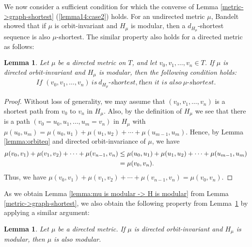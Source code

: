 \documentclass[11pt]{article}
\theoremstyle{definition}
\newtheorem{lemma}[theorem]{Lemma}
\begin{document}
We now consider a sufficient condition for which the converse of Lemma \ref{metric->graph-shortest} (\ref{lemma14:case2}) holds. For an undirected metric $\mu$, Bandelt \cite{bandelt1985} showed that if $\mu$ is orbit-invariant and $H_\mu$ is modular, then a $d_{H_\mu}$-shortest sequence is also $\mu$-shortest. The similar property also holds for a directed metric as follows:
\begin{lemma}
\label{lem:d-shortest->mu-shortest}
\textit{Let $\mu$ be a directed metric on $T$, and let $v_0,v_1,\ldots,v_n\in T$. If $\mu$ is directed orbit-invariant and $H_\mu$ is modular, then the following condition holds:}
\begin{align}
    \textit{If\ }(v_0,v_1,\ldots,v_n)\ \textit{is}\ 
    d_{H_\mu}\textit{-shortest,}\ \textit{then\ it\ is\ also}\ \mu\textit{-shortest.}
\end{align}
\end{lemma}
\begin{proof}
Without loss of generality, we may assume that $(v_0,v_1,\ldots,v_n)$ is a shortest path from $v_0$ to $v_n$ in $H_\mu$. Also, by the definition of $H_\mu$ we see that there is a path $(v_0=u_0,u_1,\ldots,u_m=v_n)$ in $H_\mu$ with $\mu(u_0,u_m)=\mu(u_0,u_1)+\mu(u_1,u_2)+\cdots+\mu(u_{m-1},u_m)$. Hence, by Lemma \ref{lemma:orbiteq} and directed orbit-invariance of $\mu$, we have
\begin{align}
    \mu(v_0,v_1)+\mu(v_1,v_2)+\cdots+\mu(v_{n-1},v_n)&\leq \mu(u_0,u_1)+\mu(u_1,u_2)+\cdots+\mu(u_{m-1},u_m)\notag\\&=\mu(v_0,v_n).
\end{align}
Thus, we have $\mu(v_0,v_1)+\mu(v_1,v_2)+\cdots+\mu(v_{n-1},v_n)=\mu(v_0,v_n)$.
\end{proof}
As we obtain Lemma \ref{lemma:mu is modular -> H is modular} from Lemma \ref{metric->graph-shortest}, we also obtain the following property from Lemma~\ref{lem:d-shortest->mu-shortest} by applying a similar argument:
\begin{lemma}
\textit{Let $\mu$ be a directed metric. If $\mu$ is directed orbit-invariant and $H_\mu$ is modular, then $\mu$ is also modular.}
\end{lemma}
\end{document}
